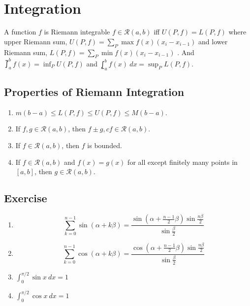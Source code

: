 \chapter{Integration}
\begin{definition}
	A function $f$ is Riemann integrable $f \in \mathscr{R}(a,b)$ iff $U(P,f) = L(P,f)$ where upper Riemann sum, $U(P,f) = \sum_P \max f(x)(x_i-x_{i-1})$ and lower Riemann sum, $L(P,f) = \sum_P \min f(x)(x_i-x_{i-1})$ . And $\upint_a^b f(x) = \inf_P U(P,f)$ and $\lowint_a^b f(x)\ dx = \sup_P L(P,f)$.
\end{definition}

\section{Properties of Riemann Integration}
\begin{enumerate}
	\item $m(b-a) \le L(P,f) \le U(P,f) \le M(b-a)$.
	\item If $f,g \in \mathscr{R}(a,b)$, then $f \pm g, cf \in \mathscr{R}(a,b)$.
	\item If $f \in \mathscr{R}(a,b)$, then $f$ is bounded.
	\item If $f \in \mathscr{R}(a,b)$ and $f(x) = g(x)$ for all except finitely many points in $[a,b]$, then $g \in \mathscr{R}(a,b)$.
\end{enumerate}

\section*{Exercise}
\begin{enumerate}
	\item $$\sum_{k=0}^{n-1} \sin (\alpha+k\beta) = \frac{\sin (\alpha + \frac{n-1}{2}\beta) \sin \frac{n\beta}{2}}{\sin \frac{\beta}{2}}$$
	\item $$\sum_{k=0}^{n-1} \cos (\alpha+k\beta) = \frac{\cos (\alpha + \frac{n-1}{2}\beta) \sin \frac{n\beta}{2}}{\sin \frac{\beta}{2}}$$
	\item $\int_0^{\pi/2} \sin x\ dx = 1$
	\item $\int_0^{\pi/2} \cos x\ dx = 1$
\end{enumerate}
